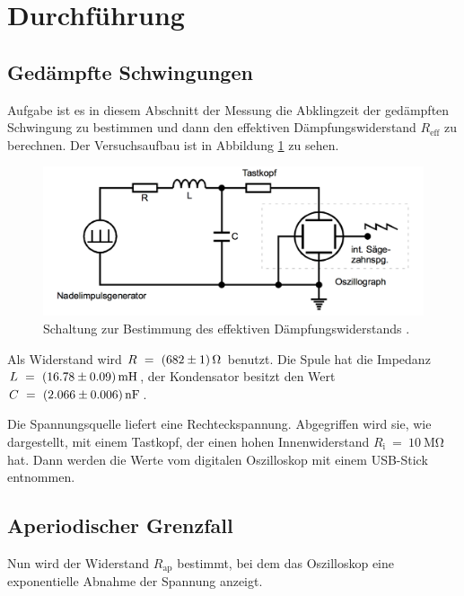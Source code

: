  \section{Durchführung}
\label{sec:Durchführung}

\subsection{Gedämpfte Schwingungen}
\label{sec:durchgedschw}

Aufgabe ist es in diesem Abschnitt der Messung die Abklingzeit der gedämpften
Schwingung zu bestimmen und dann den effektiven Dämpfungswiderstand $R_{\text{eff}}$
zu berechnen.
Der Versuchsaufbau ist in Abbildung \ref{fig:schalta} zu sehen.

\begin{figure}[h]
  \centering
  \includegraphics[width = \textwidth]{Schaltunga.pdf}
  \caption{Schaltung zur Bestimmung des effektiven Dämpfungswiderstands \cite{anleitung}.}
  \label{fig:schalta}
\end{figure}

Als Widerstand wird $R~=~\SI{682 +- 1}{\ohm}$ benutzt. Die Spule hat
die Impedanz $L~=~\SI{16.78 +- 0.09}{\milli\henry}$, der Kondensator besitzt
den Wert $C~=~\SI{2.066 +- 0.006}{\nano\farad}$.

Die Spannungsquelle liefert eine Rechteckspannung. Abgegriffen wird sie,
wie dargestellt, mit einem Tastkopf, der einen hohen Innenwiderstand
$R_{\text{i}}~=~\SI{10}{\mega\ohm}$ hat. Dann werden die Werte vom digitalen
Oszilloskop mit einem USB-Stick entnommen.

\subsection{Aperiodischer Grenzfall}

Nun wird der Widerstand $R_{\text{ap}}$ bestimmt, bei dem das Oszilloskop
eine exponentielle Abnahme der Spannung anzeigt.

